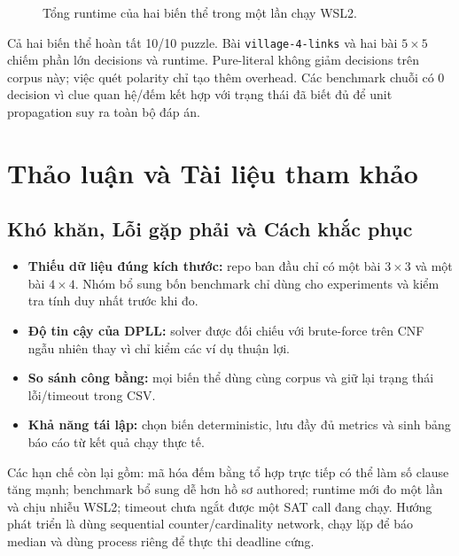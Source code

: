 \documentclass[11pt,a4paper]{report}
\begin{document}
\begin{figure}[H]
\centering
{}
\caption{Tổng runtime của hai biến thể trong một lần chạy WSL2.}
\end{figure}

Cả hai biến thể hoàn tất 10/10 puzzle. Bài \texttt{village-4-links} và hai bài
$5\times5$ chiếm phần lớn decisions và runtime. Pure-literal không giảm
decisions trên corpus này;
việc quét polarity chỉ tạo thêm overhead. Các benchmark chuỗi có 0 decision vì
clue quan hệ/đếm kết hợp với trạng thái đã biết đủ để unit propagation suy ra
toàn bộ đáp án.

\chapter{Thảo luận và Tài liệu tham khảo}

\section{Khó khăn, Lỗi gặp phải và Cách khắc phục}
\begin{itemize}
  \item \textbf{Thiếu dữ liệu đúng kích thước:} repo ban đầu chỉ có một bài
        $3\times3$ và một bài $4\times4$. Nhóm bổ sung bốn benchmark chỉ dùng cho
        experiments và kiểm tra tính duy nhất trước khi đo.
  \item \textbf{Độ tin cậy của DPLL:} solver được đối chiếu với brute-force trên
        CNF ngẫu nhiên thay vì chỉ kiểm các ví dụ thuận lợi.
  \item \textbf{So sánh công bằng:} mọi biến thể dùng cùng corpus và giữ lại
        trạng thái lỗi/timeout trong CSV.
  \item \textbf{Khả năng tái lập:} chọn biến deterministic, lưu đầy đủ metrics
        và sinh bảng báo cáo từ kết quả chạy thực tế.
\end{itemize}

Các hạn chế còn lại gồm: mã hóa đếm bằng tổ hợp trực tiếp có thể làm số clause
tăng mạnh; benchmark bổ sung dễ hơn hồ sơ authored; runtime mới đo một lần và
chịu nhiễu WSL2; timeout chưa ngắt được một SAT call đang chạy. Hướng phát triển
là dùng sequential counter/cardinality network, chạy lặp để báo median và dùng
process riêng để thực thi deadline cứng.
\end{document}

